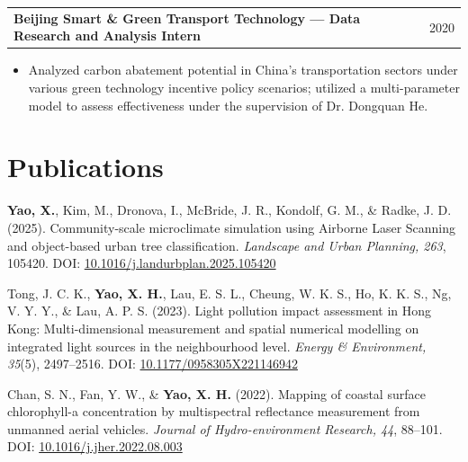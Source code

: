 \documentclass[a4paper,12pt]{article}
\makeatletter
\newenvironment{joblong}[2]
{
\begin{tabularx}{\linewidth}{@{}l X r@{}}
\textbf{#1} & \hfill &  #2 \\[3.75pt]
\end{tabularx}
\begin{minipage}[t]{\linewidth}
\begin{itemize}[nosep,after=\strut,leftmargin=1.2em,itemsep=3pt,label=--]
}
{
\end{itemize}
\end{minipage}
}
\makeatother
\begin{document}
\begin{joblong}{Beijing Smart \& Green Transport Technology --- Data Research and Analysis Intern}{2020}
\item Analyzed carbon abatement potential in China's transportation sectors under various green technology incentive policy scenarios; utilized a multi-parameter model to assess effectiveness under the supervision of Dr. Dongquan He.
\end{joblong}

\section{Publications}

\begin{etaremune}[leftmargin=1.5em, itemsep=0.7em, start=3]
    \item \textbf{Yao, X.}, Kim, M., Dronova, I., McBride, J. R., Kondolf, G. M., \& Radke, J. D. (2025). Community-scale microclimate simulation using Airborne Laser Scanning and object-based urban tree classification. \textit{Landscape and Urban Planning, 263}, 105420. DOI: \href{https://doi.org/10.1016/j.landurbplan.2025.105420}{10.1016/j.landurbplan.2025.105420}

    \item Tong, J. C. K., \textbf{Yao, X. H.}, Lau, E. S. L., Cheung, W. K. S., Ho, K. K. S., Ng, V. Y. Y., \& Lau, A. P. S. (2023). Light pollution impact assessment in Hong Kong: Multi-dimensional measurement and spatial numerical modelling on integrated light sources in the neighbourhood level. \textit{Energy \& Environment, 35}(5), 2497--2516. DOI: \href{https://doi.org/10.1177/0958305X221146942}{10.1177/0958305X221146942}

    \item Chan, S. N., Fan, Y. W., \& \textbf{Yao, X. H.} (2022). Mapping of coastal surface chlorophyll-a concentration by multispectral reflectance measurement from unmanned aerial vehicles. \textit{Journal of Hydro-environment Research, 44}, 88--101. DOI: \href{https://doi.org/10.1016/j.jher.2022.08.003}{10.1016/j.jher.2022.08.003}
\end{etaremune}
\end{document}
